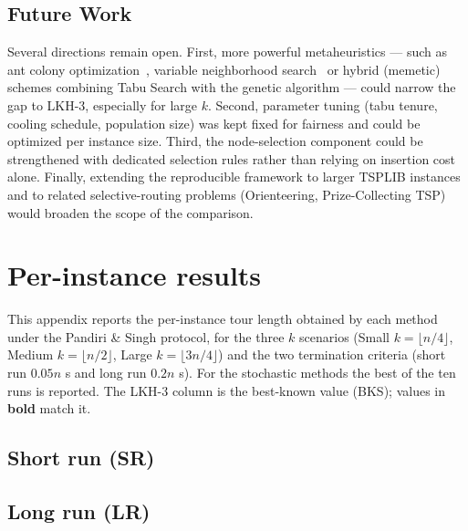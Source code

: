 \documentclass[12pt,a4paper,oneside]{report}
\begin{document}
\section{Future Work}\label{sec:future}
Several directions remain open. First, more powerful metaheuristics --- such as
ant colony optimization~\cite{dorigo1997acs}, variable neighborhood
search~\cite{mladenovic1997vns} or hybrid (memetic) schemes combining Tabu Search
with the genetic algorithm --- could narrow the gap to LKH-3, especially for large
$k$. Second, parameter tuning (tabu tenure, cooling schedule, population size) was
kept fixed for fairness and could be optimized per instance size. Third, the
node-selection component could be strengthened with dedicated selection rules
rather than relying on insertion cost alone. Finally, extending the reproducible
framework to larger TSPLIB instances and to related selective-routing problems
(Orienteering, Prize-Collecting TSP) would broaden the scope of the comparison.

\clearpage

\clearpage
\appendix
\chapter{Per-instance results}\label{app:tables}
This appendix reports the per-instance tour length obtained by each method under the
Pandiri \& Singh protocol, for the three $k$ scenarios (Small $k=\lfloor n/4\rfloor$,
Medium $k=\lfloor n/2\rfloor$, Large $k=\lfloor 3n/4\rfloor$) and the two termination
criteria (short run $0.05n$ s and long run $0.2n$ s). For the stochastic methods the
best of the ten runs is reported. The LKH-3 column is the best-known value (BKS);
values in \textbf{bold} match it.

\begin{landscape}
\section{Short run (SR)}



\section{Long run (LR)}



\end{landscape}

\clearpage

\end{document}
